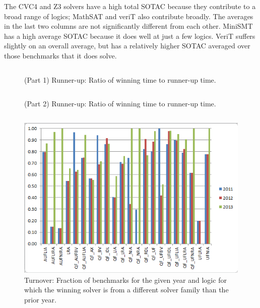 \documentclass{eptcs}
\begin{document}
\begin{itemize}
The CVC4 and Z3 solvers have a high total SOTAC because they contribute to a broad range of logics; MathSAT and veriT also contribute broadly. The averages in the last two columns are not significantly different from each other. MiniSMT has a high average SOTAC because it does well at just a few logics. VeriT suffers slightly on an overall average, but has a relatively higher SOTAC averaged over those benchmarks that it does solve.

\end{itemize}

\begin{figure}
\centering
\begin{tabular}{|ll|r|rrrr|}
\hline

\end{tabular}
\caption{(Part 1) Runner-up: Ratio of winning time to runner-up time.}
\label{Fig:runnerup1}
\end{figure}

\begin{figure}
\centering
\begin{tabular}{|ll|r|rrrr|}
\hline

\end{tabular}
\caption{(Part 2) Runner-up: Ratio of winning time to runner-up time.}
\label{Fig:runnerup2}
\end{figure}


\begin{figure}
\centering
\begin{tabular}{|l|rrr|p{.3in}|l|rrr|}
\hline

\hline
\end{tabular}
\vspace{.2in}
\includegraphics{turnover}
\caption{Turnover: Fraction of benchmarks for the given year and logic for which the winning solver is from a different solver family than the prior year.}
\label{Fig:turnover}
\end{figure}
\end{document}
